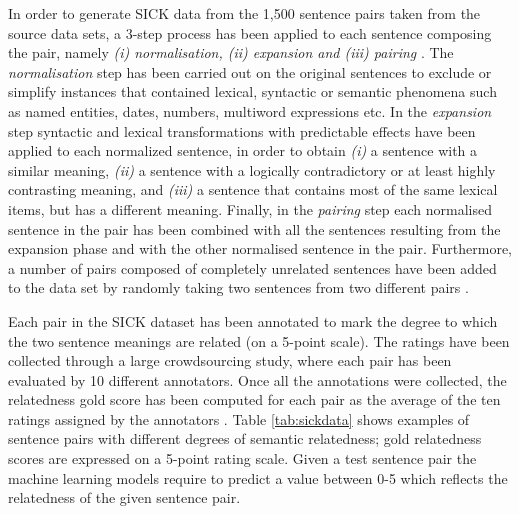 \begin{enumerate}
  In order to generate SICK data from the 1,500 sentence pairs taken from the source data sets, a 3-step process has been applied to each sentence composing the pair, namely \textit{(i) normalisation, (ii) expansion and (iii) pairing} \cite{marelli-etal-2014-semeval}. The \textit{normalisation} step has been carried out on the original sentences to exclude or simplify instances that contained lexical, syntactic or semantic phenomena such as named entities, dates, numbers, multiword expressions etc. In the \textit{expansion} step syntactic and lexical transformations with predictable effects have been applied to each normalized sentence, in
  order to obtain \textit{(i)} a sentence with a similar meaning, \textit{(ii)} a sentence with a logically contradictory or at least highly contrasting meaning, and \textit{(iii)} a sentence that contains most of the same lexical items, but has a different meaning. Finally, in the \textit{pairing} step each normalised sentence in the pair has been combined with all the sentences resulting from the expansion phase and with the other normalised sentence in the pair. Furthermore, a number of pairs composed of completely unrelated sentences have been added to the data set by randomly taking two sentences from two different pairs \cite{marelli-etal-2014-semeval}. 
  
  Each pair in the SICK dataset has been annotated to mark the degree to which the two sentence meanings are related (on a 5-point scale). The ratings 
  have been collected through a large crowdsourcing study, where each pair 
  has been evaluated by 10 different annotators. Once all the annotations were collected, the relatedness gold score has been computed for each pair as the average of the ten ratings assigned by the annotators \cite{marelli-etal-2014-semeval}. Table \ref{tab:sickdata} shows examples of sentence pairs with different degrees of semantic relatedness; gold relatedness scores are expressed on a 5-point rating scale. Given a test sentence pair the machine learning models require to predict a value between 0-5 which reflects the relatedness of the given sentence pair. 
  

\end{enumerate}

